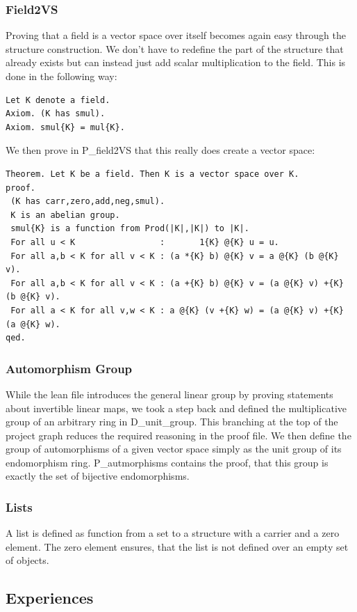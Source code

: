 \documentclass[11pt]{article}
\begin{document}
\subsubsection{Field2VS}
Proving that a field is a vector space over itself becomes again easy through the structure construction. We don't have to redefine the part of the structure that already exists but can instead just add scalar multiplication to the field. This is done in the following way:
\begin{lstlisting}
Let K denote a field.
Axiom. (K has smul).
Axiom. smul{K} = mul{K}.
\end{lstlisting}
We then prove in P\_field2VS that this really does create a vector space:
\begin{lstlisting}
Theorem. Let K be a field. Then K is a vector space over K.
proof.
 (K has carr,zero,add,neg,smul).
 K is an abelian group.
 smul{K} is a function from Prod(|K|,|K|) to |K|.
 For all u < K                 :       1{K} @{K} u = u.
 For all a,b < K for all v < K : (a *{K} b) @{K} v = a @{K} (b @{K} v).
 For all a,b < K for all v < K : (a +{K} b) @{K} v = (a @{K} v) +{K} (b @{K} v).
 For all a < K for all v,w < K : a @{K} (v +{K} w) = (a @{K} v) +{K} (a @{K} w).
qed.
\end{lstlisting}


\subsubsection{Automorphism Group}
While the lean file introduces the general linear group by proving statements about invertible linear maps, we took a step back and defined the multiplicative group of an arbitrary ring in D\_unit\_group. This branching at the top of the project graph reduces the required reasoning in the proof file.
We then define the group of automorphisms of a given vector space simply as the unit group of its endomorphism ring. P\_autmorphisms contains the proof, that this group is exactly the set of bijective endomorphisms.

\subsubsection{Lists}

A list is defined as function from a set to a structure with a carrier and a zero element. The zero element ensures, that the list is not defined over an empty set of objects. 


\subsection{Experiences}
\end{document}
